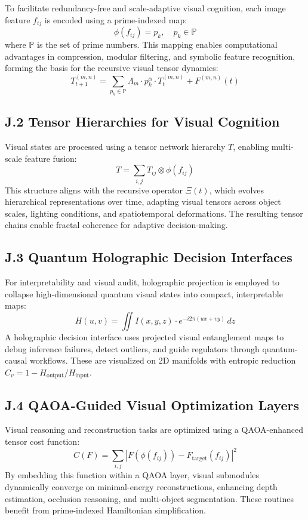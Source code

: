 \documentclass[12pt]{article}
\begin{document}
\begin{itemize}
To facilitate redundancy-free and scale-adaptive visual cognition, each image feature \( f_{ij} \) is encoded using a prime-indexed map:
\[
\phi(f_{ij}) = p_k, \quad p_k \in \mathbb{P}
\]
where \( \mathbb{P} \) is the set of prime numbers. This mapping enables computational advantages in compression, modular filtering, and symbolic feature recognition, forming the basis for the recursive visual tensor dynamics:
\[
T_{t+1}^{(m,n)} = \sum_{p_k \in \mathbb{P}} \Lambda_m \cdot p_k^\alpha \cdot T_t^{(m,n)} + F^{(m,n)}(t)
\]

\subsection*{J.2 Tensor Hierarchies for Visual Cognition}

Visual states are processed using a tensor network hierarchy \( T \), enabling multi-scale feature fusion:
\[
T = \sum_{i,j} T_{ij} \otimes \phi(f_{ij})
\]
This structure aligns with the recursive operator \( \Xi(t) \), which evolves hierarchical representations over time, adapting visual tensors across object scales, lighting conditions, and spatiotemporal deformations. The resulting tensor chains enable fractal coherence for adaptive decision-making.

\subsection*{J.3 Quantum Holographic Decision Interfaces}

For interpretability and visual audit, holographic projection is employed to collapse high-dimensional quantum visual states into compact, interpretable maps:
\[
H(u, v) = \iint I(x, y, z) \cdot e^{-i2\pi(ux + vy)} \, dz
\]
A holographic decision interface uses projected visual entanglement maps to debug inference failures, detect outliers, and guide regulators through quantum-causal workflows. These are visualized on 2D manifolds with entropic reduction \( C_v = 1 - H_{\text{output}} / H_{\text{input}} \).

\subsection*{J.4 QAOA-Guided Visual Optimization Layers}

Visual reasoning and reconstruction tasks are optimized using a QAOA-enhanced tensor cost function:
\[
C(F) = \sum_{i,j} \left|F(\phi(f_{ij})) - F_{\text{target}}(f_{ij})\right|^2
\]
By embedding this function within a QAOA layer, visual submodules dynamically converge on minimal-energy reconstructions, enhancing depth estimation, occlusion reasoning, and multi-object segmentation. These routines benefit from prime-indexed Hamiltonian simplification.


\end{itemize}
\end{document}
